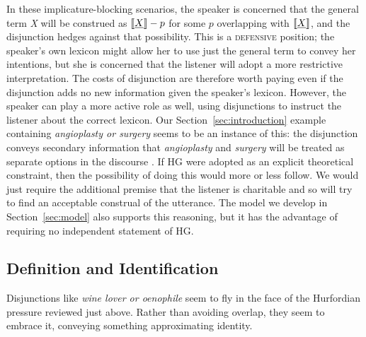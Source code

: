 \documentclass[12pt,twoside]{article}
\newcommand{\secref}[1]{Section~\ref{#1}}
\newcommand{\word}[1]{\emph{#1}}
\newcommand{\sem}[1]{\ensuremath{\llbracket#1\rrbracket}}
\renewcommand{\_}{\textbf{\textunderscore\hspace{-4pt}\textunderscore\hspace{-3pt}\textunderscore\hspace{-4pt}\textunderscore}\hspace{0.5pt}}			%
\newcommand{\technicalTerm}[1]{\textsc{#1}}
\begin{document}
In these implicature-blocking scenarios, the speaker is concerned that
the general term \word{X} will be construed as $\sem{\word{X\/}}-p$
for some $p$ overlapping with $\sem{\word{X\/}}$, and the disjunction
hedges against that possibility. This is a \technicalTerm{defensive}
position; the speaker's own lexicon might allow her to use just the
general term to convey her intentions, but she is concerned that the
listener will adopt a more restrictive interpretation. The costs of
disjunction are therefore worth paying even if the disjunction adds no
new information given the speaker's lexicon.  However, the speaker can
play a more active role as well, using disjunctions to instruct the
listener about the correct lexicon. Our \secref{sec:introduction}
example containing \word{angioplasty or surgery} seems to be an
instance of this: the disjunction conveys secondary information that
\word{angioplasty} and \word{surgery} will be treated as separate
options in the discourse \citep{Simons:2001}. If HG were adopted as an
explicit theoretical constraint, then the possibility of doing this
would more or less follow. We would just require the additional
premise that the listener is charitable and so will try to find an
acceptable construal of the utterance. The model we develop in
\secref{sec:model} also supports this reasoning, but it has the
advantage of requiring no independent statement of HG.
 

\subsection{Definition and Identification}\label{sec:data:definitional}

Disjunctions like \word{wine lover or oenophile} seem to fly in the
face of the Hurfordian pressure reviewed just above. Rather than
avoiding overlap, they seem to embrace it, conveying something
approximating identity.
\end{document}
